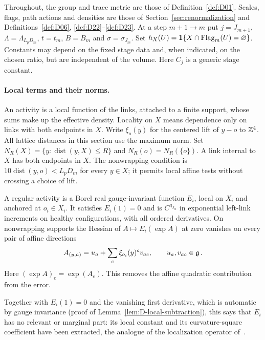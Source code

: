 Throughout, the group and trace metric are those of Definition~\ref{def:D01}. Scales, flags, path actions and densities are those of Section~\ref{sec:renormalization} and Definitions~\ref{def:D06}, \ref{def:D22}--\ref{def:D23}. At a step $m+1\to m$ put $j=J_{m+1}$, $\Lambda=\Lambda_{L_pD_m}$, $t=t_m$, $B=B_m$ and $\sigma=\sigma_{J_m}$. Set $h_X(U)=\mathbf1\{X\cap\operatorname{Flag}_m(U)=\varnothing\}$. Constants may depend on the fixed stage data and, when indicated, on the chosen ratio, but are independent of the volume. Here $C_j$ is a generic stage constant.

\paragraph{Local terms and their norms.}

An activity is a local function of the links, attached to a finite support, whose sums make up the effective density. Locality on $X$ means dependence only on links with both endpoints in $X$. Write $\xi_o(y)$ for the centered lift of $y-o$ to $\mathbb{Z}^4$. All lattice distances in this section use the maximum norm. Set $N_R(X)=\{y:\operatorname{dist}(y,X)\le R\}$ and $N_R(o)=N_R(\{o\})$. A link internal to $X$ has both endpoints in $X$. The nonwrapping condition is $10\operatorname{dist}(y,o)<L_pD_m$ for every $y\in X$; it permits local affine tests without crossing a choice of lift.

\begin{definition}\label{def:D24}
A regular activity is a Borel real gauge-invariant function $E_i$, local on $X_i$ and anchored at $o_i\in X_i$. It satisfies $E_i(1)=0$ and is $C^{\mathfrak q_{J_m}}$ in exponential left-link increments on healthy configurations, with all ordered derivatives. On nonwrapping supports the Hessian of $A\mapsto E_i(\exp A)$ at zero vanishes on every pair of affine directions
\begin{equation*}
A_{(y,a)}=u_a+\sum_c \xi_{o_i}(y)^cv_{ac},\qquad u_a,v_{ac}\in\mathfrak{g}\,.
\end{equation*}
Here $(\exp A)_e=\exp(A_e)$. This removes the affine quadratic contribution from the error.
\end{definition}

Together with $E_i(1)=0$ and the vanishing first derivative, which is automatic by gauge invariance (proof of Lemma~\ref{lem:D-local-subtraction}), this says that $E_i$ has no relevant or marginal part: its local constant and its curvature-square coefficient have been extracted, the analogue of the localization operator of~\cite{BauerschmidtBrydgesSlade2019}.

